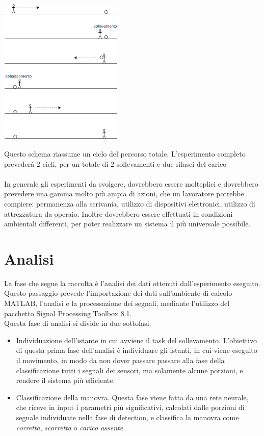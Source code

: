 \documentclass[a4paper, oneside]{book}
\begin{document}
\vspace{3mm}
\begin{minipage}{\linewidth}
\begin{center}
\includegraphics[width=59mm,scale=0.7]{./images/esperimento1.png} 
\vspace{3mm}
\end{center}
\end{minipage}
Questo schema riassume un ciclo del percorso totale. L’esperimento completo prevederà 2 cicli, per un totale di 2 sollevamenti e due rilasci del carico\\ \\
In generale gli esperimenti da svolgere, dovrebbero essere molteplici e dovrebbero prevedere una gamma molto più ampia di azioni, che un lavoratore potrebbe compiere: permanenza alla scrivania, utilizzo di dispositivi elettronici, utilizzo di attrezzatura da operaio. Inoltre dovrebbero essere effettuati in condizioni ambientali differenti, per poter realizzare un sistema il più universale possibile.

\clearpage


\chapter{Analisi}
La fase che segue la raccolta è l'analisi dei dati ottenuti dall'esperimento eseguito. Questo passaggio prevede l'importazione dei dati sull'ambiente di calcolo MATLAB, l'analisi e la processazione dei segnali, mediante l'utilizzo  del pacchetto Signal Processing Toolbox 8.1. \\
Questa fase di analisi si divide in due sottofasi:
\begin {itemize}
\item Individuazione dell'istante in cui avviene il task del sollevamento. L'obiettivo di questa prima fase dell'analisi è individuare gli istanti, in cui viene eseguito il movimento, in modo da non dover passare  passare alla fase della classificazione tutti i segnali dei sensori, ma solamente alcune porzioni, e rendere il sistema più efficiente.
\item Classificazione della manovra. Questa fase viene fatta da una rete neurale, che riceve in input i parametri più significativi, calcolati dalle porzioni di segnale individuate nella fase di detection, e classifica la manovra come \textit{corretta}, \textit{scorretta} o \textit{carico assente}.
\end{itemize}
\end{document}
